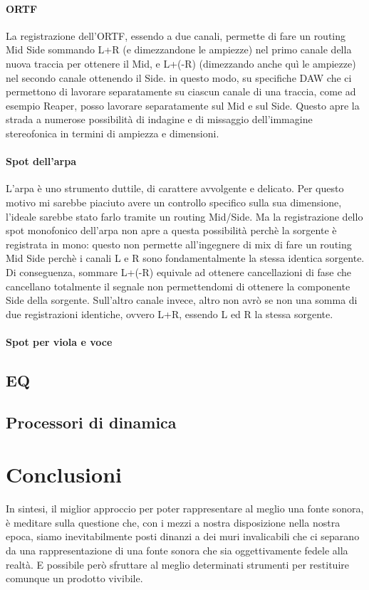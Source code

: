 		\paragraph{ORTF} La registrazione dell'ORTF, essendo a due canali, permette di fare un routing Mid Side sommando L+R (e dimezzandone le ampiezze) nel primo canale della nuova traccia per ottenere il Mid, e L+(-R) (dimezzando anche quì le ampiezze) nel secondo canale ottenendo il Side. in questo modo, su specifiche DAW che ci permettono di lavorare separatamente su ciascun canale di una traccia, come ad esempio Reaper, posso lavorare separatamente sul Mid e sul Side. Questo apre la strada a numerose possibilità di indagine e di missaggio dell'immagine stereofonica in termini di ampiezza e dimensioni.
		
		\paragraph{Spot dell'arpa} L'arpa è uno strumento duttile, di carattere avvolgente e delicato. Per questo motivo mi sarebbe piaciuto avere un controllo specifico sulla sua dimensione, l'ideale sarebbe stato farlo tramite un routing  Mid/Side. Ma la registrazione dello spot monofonico dell'arpa non apre a questa possibilità perchè la sorgente è registrata in mono: questo non permette all'ingegnere di mix di fare un routing Mid Side perchè i canali L e R sono fondamentalmente la stessa identica sorgente. Di conseguenza, sommare L+(-R) equivale ad ottenere cancellazioni di fase che cancellano totalmente il segnale non permettendomi di ottenere la componente Side della sorgente. Sull'altro canale invece, altro non avrò se non una somma di due registrazioni identiche, ovvero L+R, essendo L ed R la stessa sorgente.
		
		\paragraph{Spot per viola e voce}
	
	\subsection{EQ}
	
	\subsection{Processori di dinamica}
	
\section{Conclusioni}
In sintesi, il miglior approccio per poter rappresentare al meglio una fonte sonora, è meditare sulla questione che, con i mezzi a nostra disposizione nella nostra epoca, siamo inevitabilmente posti dinanzi a dei muri invalicabili che ci separano da una rappresentazione di una fonte sonora che sia oggettivamente fedele alla realtà.
E possibile però sfruttare al meglio determinati strumenti per restituire comunque un prodotto vivibile.
	
